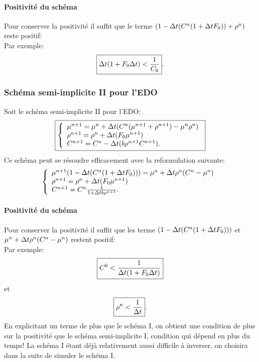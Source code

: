 \documentclass[11pt]{article}
\begin{document}
\paragraph{Positivité du schéma}
Pour conserver la positivité il suffit que le terme $(1-\Delta t(C^{n}(1+\Delta t F_0)) + \rho^{n}) $ reste positif:\\
Par exemple: 
\begin{equation}
	\boxed{{\Delta t(1+F_0\Delta t)} <\frac{1}{C_0}}.
\end{equation}

\subsubsection{Schéma semi-implicite II pour l'EDO}
Soit le schéma semi-implicite II pour l'EDO:
\begin{equation} \boxed{\left\{
                \begin{array}{ll}
                   \mu^{n+1} = \mu^{n}+  \Delta t( C^{n}(\mu^{n+1} + \rho^{n+1}) -\mu^{n}\rho^{n})\\
                \rho^{n+1}=  \rho^{n}+ \Delta t (F_0 \mu^{n+1}) \\
                 C^{n+1} =C^{n}- \Delta t(b\rho^{n+1}C^{n+1}).
                \end{array}
              \right.}
\end{equation}
Ce schéma peut se résoudre efficacement avec la reformulation suivante:
\begin{equation*} \left\{
                \begin{array}{ll}
                   \mu^{n+1}(1-\Delta t(C^{n}(1+\Delta t F_0))) = \mu^{n}+  \Delta t \rho^{n}(C^{n}-\mu^{n}) \\
                \rho^{n+1}=  \rho^{n}+ \Delta t (F_0 \mu^{n+1}) \\
                 C^{n+1} =C^{n}\frac{1}{1+ \Delta t b\rho^{n+1}}.
                \end{array}
              \right.
\end{equation*}
\paragraph{Positivité du schéma}
Pour conserver la positivité il suffit que les terme $(1-\Delta t(C^{n}(1+\Delta t F_0)))$ et $\mu^{n}+  \Delta t \rho^{n}(C^{n}-\mu^{n})$ restent positif:\\
Par exemple: 
\begin{equation}
	\boxed{C^0< \frac{1}{\Delta t(1+F_0\Delta t)}}
\end{equation}
et 
\begin{equation}
	\boxed{\rho^n< \frac{1}{\Delta t}}.
\end{equation}
En explicitant un terme de plus que le schéma I, on obtient une condition de plus sur la positivité que le schéma semi-implicite I, condition qui dépend en plus du temps! La schéma I étant déjà relativement aussi difficile à inverser, on choisira dans la suite de simuler le schéma I.  
\end{document}
